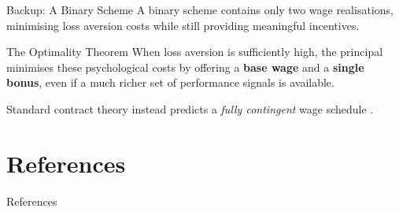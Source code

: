 \documentclass{beamer}
\begin{document}
\begin{frame}{Backup: A Binary Scheme}
    A binary scheme contains only two wage realisations, minimising loss aversion costs while still providing meaningful incentives.

    \bigskip
    
    \begin{block}{The Optimality Theorem}
        When loss aversion is sufficiently high, the principal minimises these psychological costs by offering a \textbf{base wage} and a \textbf{single bonus}, even if a much richer set of performance signals is available.
    \end{block}

    \bigskip
        
    Standard contract theory instead predicts a \emph{fully contingent} wage schedule \parencite{Holmstroem1979}.
\end{frame}


\section*{References}
\begin{frame}[allowframebreaks]{References}
    \printbibliography
\end{frame}
\end{document}
